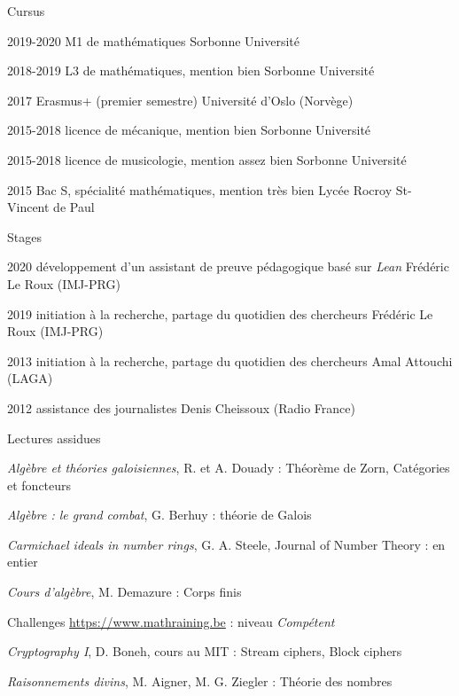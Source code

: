 \documentclass{LoLaTeXcv}
\begin{document}
	


\begin{lltxHistory}{Cursus}
	\item[2019-2020] M1 de mathématiques \lltxdotfill Sorbonne Université
	\item[2018-2019] L3 de mathématiques, mention bien \lltxdotfill Sorbonne Université
	\item[2017] Erasmus+ (premier semestre) \lltxdotfill Université d'Oslo (Norvège)
	\item[2015-2018] licence de mécanique, mention bien \lltxdotfill Sorbonne Université
	\item[2015-2018] licence de musicologie, mention assez bien \lltxdotfill Sorbonne Université
	\item[2015] Bac S, spécialité mathématiques, mention très bien \lltxdotfill Lycée Rocroy St-Vincent de Paul
\end{lltxHistory}

\begin{lltxHistory}{Stages}
	\item[2020] développement d'un assistant de preuve pédagogique basé sur \textit{Lean} \lltxdotfill Frédéric Le Roux (IMJ-PRG)
	\item[2019] initiation à la recherche, partage du quotidien des chercheurs \lltxdotfill Frédéric Le Roux (IMJ-PRG)
	\item[2013] initiation à la recherche, partage du quotidien des chercheurs \lltxdotfill Amal Attouchi (LAGA)
	\item[2012] assistance des journalistes \lltxdotfill Denis Cheissoux (Radio France)
\end{lltxHistory}

\begin{lltxItemize}{Lectures assidues}
	\item{\textit{Algèbre et théories galoisiennes}, R. et A. Douady : Théorème de Zorn, Catégories et foncteurs}
	\item{\textit{Algèbre : le grand combat}, G. Berhuy : théorie de Galois}
	\item{\textit{Carmichael ideals in number rings}, G. A. Steele, Journal of Number Theory : en entier}
	\item{\textit{Cours d'algèbre}, M. Demazure : Corps finis}
	\item{Challenges \url{https://www.mathraining.be} : niveau \textit{Compétent}}
	\item{\textit{Cryptography I}, D. Boneh, cours au MIT : Stream ciphers, Block ciphers}
	\item{\textit{Raisonnements divins}, M. Aigner, M. G. Ziegler : Théorie des nombres}
\end{lltxItemize}
\end{document}
